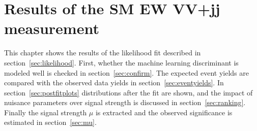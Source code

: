 \chapter{Results of the SM EW VV+jj measurement}
\label{chap:results}
This chapter shows the results of the likelihood fit described in section~\ref{sec:likelihood}.
First, whether the machine learning discriminant is modeled well is checked in section~\ref{sec:confirm}.
The expected event yields are compared with the observed data yields in section~\ref{sec:eventyields}.
In section~\ref{sec:postfitplots} distributions after the fit are shown, and the impact of nuisance parameters over signal strength is discussed in section~\ref{sec:ranking}.
Finally the signal strength $\mu$ is extracted and the observed significance is estimated in section~\ref{sec:mu}.

